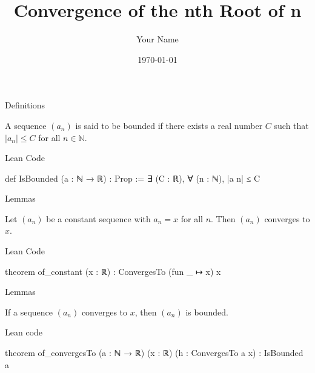 \documentclass{beamer}
\title{Convergence of the nth Root of n}
\author{Your Name}
\date{\today}
\begin{document}
\begin{frame}
    \titlepage
\end{frame}

\begin{frame}[fragile]{Definitions}
    \begin{definition}
        A sequence $(a_n)$ is said to be bounded if there exists a real number $C$ such that $|a_n| \leq C$ for all $n \in \mathbb{N}$.
    \end{definition}
    \begin{block}{Lean Code}
        \begin{leancode}
        def IsBounded (a : ℕ → ℝ) : Prop :=
        ∃ (C : ℝ), ∀ (n : ℕ), |a n| ≤ C
        \end{leancode}
    \end{block}

\end{frame}

\begin{frame}[fragile]{Lemmas}
    \begin{lemma} 
        Let $(a_n)$ be a constant sequence with $a_n = x$ for all $n$. Then $(a_n)$ converges to $x$.
    \end{lemma}

    \begin{block}{Lean Code}
    \begin{leancode}
    theorem of_constant (x : ℝ) : ConvergesTo (fun _ ↦ x) x
    \end{leancode}
    \end{block}
\end{frame}

\begin{frame}[fragile]{Lemmas}
    \begin{lemma}
        If a sequence $(a_n)$ converges to $x$, then $(a_n)$ is bounded.
    \end{lemma}

    \begin{block}{Lean code}
    \begin{leancode}
    theorem of_convergesTo (a : ℕ → ℝ) (x : ℝ) 
    (h : ConvergesTo a x) : IsBounded a 
    \end{leancode}
    \end{block}
\end{frame}
\end{document}
